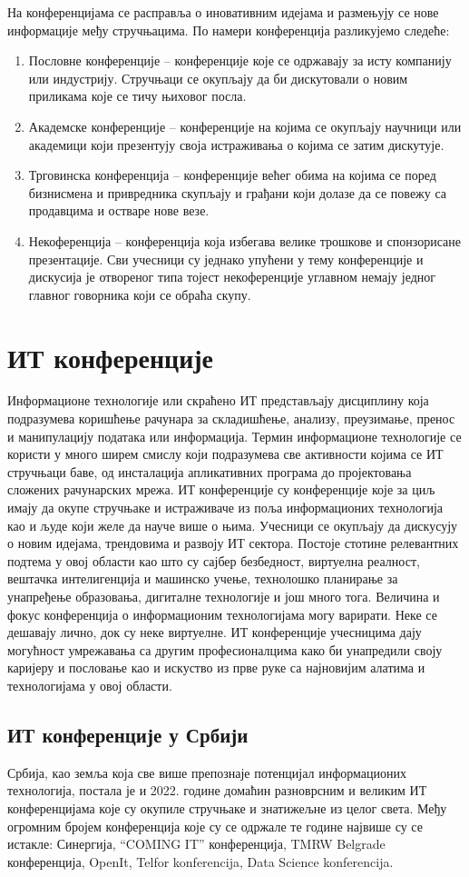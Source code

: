 \documentclass[12pt]{article}
\begin{document}
На конференцијама се расправља о иновативним идејама и размењују се нове информације међу стручњацима. По намери конференција разликујемо следеће:
\begin{enumerate}
    \item Пословне конференције – конференције које се одржавају за исту компанију или индустрију. Стручњаци се окупљају да би дискутовали о новим приликама које се тичу њиховог посла.
    \item Академске конференције – конференције на којима се окупљају научници или академици који презентују своја истраживања о којима се затим дискутује.
    \item Трговинска конференција – конференције већег обима на којима се поред бизнисмена и привредника скупљају и грађани који долазе да се повежу са продавцима и остваре нове везе.
    \item Некоференција – конференција која избегава велике трошкове и спонзорисане презентације. Сви учесници су једнако упућени у тему конференције и дискусија је отвореног типа тојест некоференције углавном немају једног главног говорника који се обраћа скупу.
\end{enumerate}

\pagebreak

\section{ИТ конференције}
Информационе технологије или скраћено ИТ представљају дисциплину која подразумева коришћење рачунара за складишћење, анализу, преузимање, пренос и манипулацију података или информација. Термин информационе технологије се користи у много ширем смислу који подразумева све активности којима се ИТ стручњаци баве, од инсталација апликативних програма до пројектовања сложених рачунарских мрежа.
ИТ конференције су конференције које за циљ имају да окупе стручњаке и истраживаче из поља информационих технологија као и људе који желе да науче више о њима. Учесници се окупљају да дискусују о новим идејама, трендовима и развоју ИТ сектора. Постоје стотине релевантних подтема у овој области као што су сајбер безбедност, виртуелна реалност, вештачка интелигенција и машинско учење, технолошко планирање за унапређење образовања, дигиталне технологије и још много тога. Величина и фокус конференција о информационим технологијама могу варирати. Неке се дешавају лично, док су неке виртуелне. ИТ конференције учесницима дају могућност умрежавања са другим професионалцима како би унапредили своју каријеру и пословање као и искуство из прве руке са најновијим алатима и технологијама у овој области.
\subsection{ИТ конференције у Србији}
Србија, као земља која све више препознаје потенцијал информационих технологија, постала је и 2022. године домаћин разноврсним и великим ИТ конференцијама које су окупиле стручњаке и знатижељне из целог света. Међу огромним бројем конференција које су се одржале те године највише су се истакле: Синергија, “COMING IT” конференција, TMRW Belgrade конференција, OpenIt, Telfor konferencija, Data Science konferencija.
\end{document}
